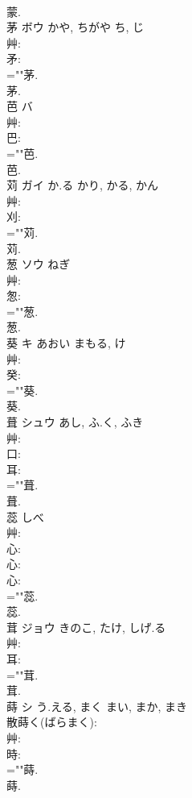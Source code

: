 \documentclass[8pt]{extreport}
\begin{document}
\begin{CJK}{UTF8}{min}
\\	蒙.
\\	茅	ボウ	かや, ちがや	ち, じ	
\\	艸: 
\\	矛: 
\\	=""茅.
\\	茅.
\\	芭	バ			
\\	艸: 
\\	巴: 
\\	=""芭.
\\	芭.
\\	苅	ガイ	か.る	かり, かる, かん	
\\	艸: 
\\	刈: 
\\	=""苅.
\\	苅.
\\	葱	ソウ	ねぎ		
\\	艸: 
\\	怱: 
\\	=""葱.
\\	葱.
\\	葵	キ	あおい	まもる, け	
\\	艸: 
\\	癸: 
\\	=""葵.
\\	葵.
\\	葺	シュウ	あし, ふ.く, ふき		
\\	艸: 
\\	口: 
\\	耳: 
\\	=""葺.
\\	葺.
\\	蕊		しべ				
\\	艸: 
\\	心: 
\\	心: 
\\	心: 
\\	=""蕊.
\\	蕊.
\\	茸	ジョウ	きのこ, たけ, しげ.る		
\\	艸: 
\\	耳: 
\\	=""茸.
\\	茸.
\\	蒔	シ	う.える, まく	まい, まか, まき	
\\	散蒔く(ばらまく): 
\\	艸: 
\\	時: 
\\	=""蒔.
\\	蒔.

\end{CJK}
\end{document}

